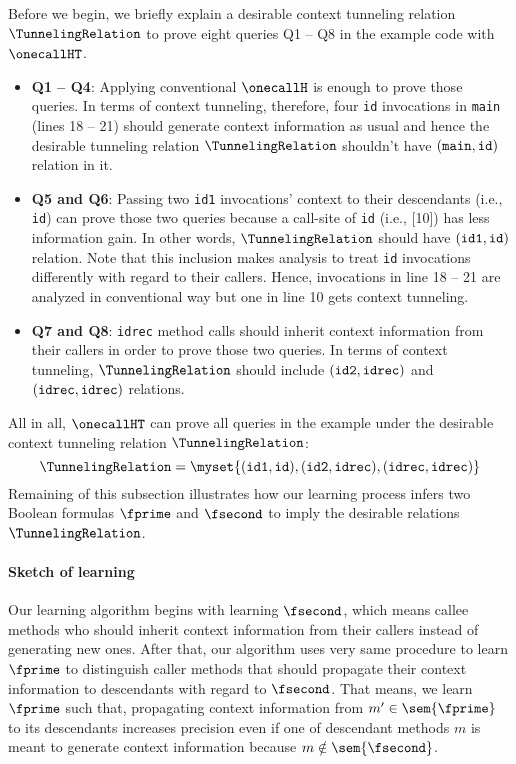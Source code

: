 Before we begin, we briefly explain a desirable context tunneling relation $\TunnelingRelation$ to prove eight queries Q1 -- Q8 in the example code with $\onecallHT$.
\begin{itemize}
\item {\bf Q1 -- Q4}: Applying conventional $\onecallH$ is enough to prove those queries. In terms of context tunneling, therefore, four {\tt id} invocations in {\tt main} (lines 18 -- 21) should generate context information as usual and hence the desirable tunneling relation $\TunnelingRelation$ shouldn't have $({\tt main}, {\tt id})$ relation in it.
\item {\bf Q5 and Q6}: Passing two {\tt id1} invocations' context to their descendants (i.e., {\tt id}) can prove those two queries because a call-site of {\tt id} (i.e., [10]) has less information gain. In other words, $\TunnelingRelation$ should have $({\tt id1}, {\tt id})$ relation. Note that this inclusion makes analysis to treat {\tt id} invocations differently with regard to their callers. Hence, invocations in line 18 -- 21 are analyzed in conventional way but one in line 10 gets context tunneling.
\item {\bf Q7 and Q8}: {\tt idrec} method calls should inherit context information from their callers in order to prove those two queries. In terms of context tunneling, $\TunnelingRelation$ should include $({\tt id2}, {\tt idrec})$ and $({\tt idrec}, {\tt idrec})$ relations.
\end{itemize}
All in all, $\onecallHT$ can prove all queries in the example under the desirable context tunneling relation $\TunnelingRelation$:
\[
\TunnelingRelation=\myset{({\tt id1}, {\tt id}), ({\tt id2}, {\tt idrec}), ({\tt idrec}, {\tt idrec})}
\]
Remaining of this subsection illustrates how our learning process infers two Boolean formulas $\fprime$ and $\fsecond$ to imply the desirable relations $\TunnelingRelation$.

\paragraph{Sketch of learning} Our learning algorithm begins with learning $\fsecond$, which means callee methods who should inherit context information from their callers instead of generating new ones. After that, our algorithm uses very same procedure to learn $\fprime$ to distinguish caller methods that should propagate their context information to descendants with regard to $\fsecond$. That means, we learn $\fprime$ such that, propagating context information from $m' \in \sem{\fprime}$ to its descendants increases precision even if one of descendant methods $m$ is meant to generate context information because $m \notin \sem{\fsecond}$.


